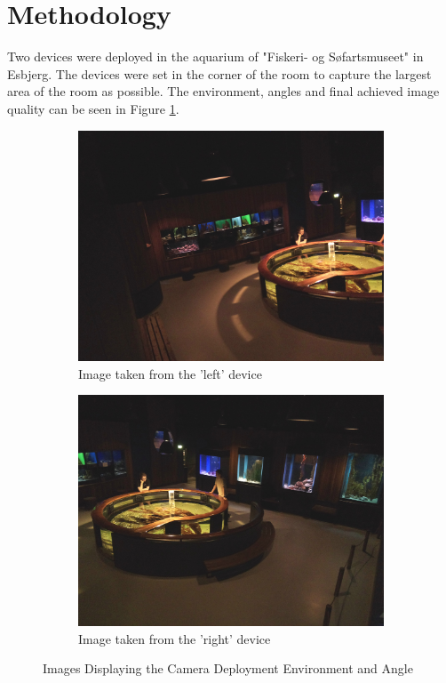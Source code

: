 \section{Methodology}
\label{sec:methodology}
Two devices were deployed in the aquarium of "Fiskeri- og Søfartsmuseet" in Esbjerg. The devices were set in the corner of the room to capture the largest area of the room as possible. The environment, angles and final achieved image quality can be seen in Figure \ref{fig:device_deployments}.

\begin{figure}[H]
    \centering
    \begin{subfigure}{0.49\textwidth}
        \centering
        \includegraphics[width=\textwidth]{Images/DeviceImages/3rd/130524-155118_hm12.jpg}
        \caption{Image taken from the 'left' device}
    \end{subfigure}
    \hfill
    \begin{subfigure}{0.49\textwidth}
        \centering
        \includegraphics[width=\textwidth]{Images/DeviceImages/3rd/130524-155118_hm40.jpg}
        \caption{Image taken from the 'right' device}
    \end{subfigure}
    \caption{Images Displaying the Camera Deployment Environment and Angle}
    \label{fig:device_deployments}
\end{figure}

